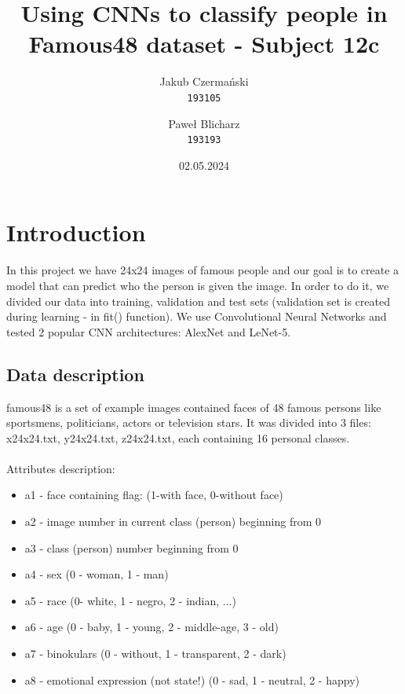 \documentclass[12pt]{article}
\author{
  Jakub Czermański\\
  \texttt{193105}
  \and
  Paweł Blicharz\\
  \texttt{193193}
}
\date{02.05.2024}
\title{Using CNNs to classify people in Famous48 dataset - Subject 12c}
\begin{document}
  \maketitle
  \newpage
  \tableofcontents
  \newpage

  \section{Introduction}
    In this project we have 24x24 images of famous people and our goal is to create
    a model that can predict who the person is given the image. In order to do it,
    we divided our data into training, validation and test sets (validation set
    is created during learning - in fit() function). We use Convolutional Neural Networks
    and tested 2 popular CNN architectures: AlexNet and LeNet-5.
    \subsection*{Data description}
      famous48 is a set of example images contained faces of 48 famous persons like sportsmens, politicians, actors or television stars. It was divided into 3 files: x24x24.txt, y24x24.txt, z24x24.txt, each containing 16 personal classes.
      \\\\
      Attributes description:
      \begin{itemize}
        \item a1 - face containing flag: (1-with face, 0-without face)
        \item a2 - image number in current class (person) beginning from 0
        \item a3 - class (person) number beginning from 0
        \item a4 - sex (0 - woman, 1 - man)
        \item a5 - race (0- white, 1 - negro, 2 - indian, ...)
        \item a6 - age (0 - baby, 1 - young, 2 - middle-age, 3 - old)
        \item a7 - binokulars (0 - without, 1 - transparent, 2 - dark)
        \item a8 - emotional expression (not state!) (0 - sad, 1 - neutral, 2 - happy)
      \end{itemize}
\end{document}
